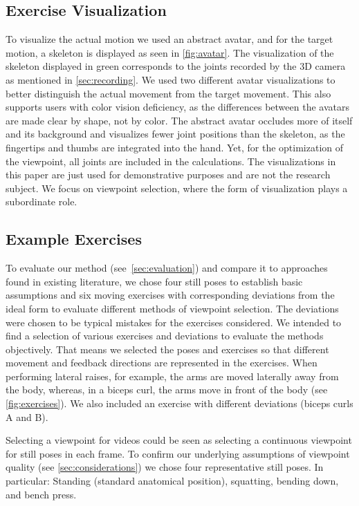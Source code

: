 \subsection{Exercise Visualization \label{sec:exercise}}
To visualize the actual motion we used an abstract avatar, and for the target motion, a skeleton is displayed as seen in \autoref{fig:avatar}. The visualization of the skeleton displayed in green corresponds to the joints recorded by the 3D camera~\cite{kinect:documentation} as mentioned in \autoref{sec:recording}. We used two different avatar visualizations to better distinguish the actual movement from the target movement. This also supports users with color vision deficiency, as the differences between the avatars are made clear by shape, not by color. The abstract avatar occludes more of itself and its background and visualizes fewer joint positions than the skeleton, as the fingertips and thumbs are integrated into the hand. Yet, for the optimization of the viewpoint, all joints are included in the calculations. The visualizations in this paper are just used for demonstrative purposes and are not the research subject. We focus on viewpoint selection, where the form of visualization plays a subordinate role.

\subsection{Example Exercises\label{sec:example}}

To evaluate our method (see~\autoref{sec:evaluation}) and compare it to approaches found in existing literature, we chose four still poses to establish basic assumptions and six moving exercises with corresponding deviations from the ideal form to evaluate different methods of viewpoint selection. The deviations were chosen to be typical mistakes for the exercises considered. We intended to find a selection of various exercises and deviations to evaluate the methods objectively. That means we selected the poses and exercises so that different movement and feedback directions are represented in the exercises. When performing lateral raises, for example, the arms are moved laterally away from the body, whereas, in a biceps curl, the arms move in front of the body (see \autoref{fig:exercises}). We also included an exercise with different deviations (biceps curls A and B).

Selecting a viewpoint for videos could be seen as selecting a continuous viewpoint for still poses in each frame. To confirm our underlying assumptions of viewpoint quality (see \autoref{sec:considerations}) we chose four representative still poses. In particular: Standing (standard anatomical position), squatting, bending down, and bench press.

